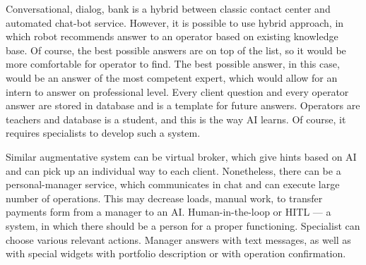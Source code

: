 Conversational, dialog, bank is a hybrid between classic contact center and automated chat-bot service.
However, it is possible to use hybrid approach, in which robot recommends answer to an operator based on existing knowledge base.
Of course, the best possible answers are on top of the list, so it would be more comfortable for operator to find.
The best possible answer, in this case, would be an answer of the most competent expert, which would allow for an intern to answer on professional level.
Every client question and every operator answer are stored in database and is a template for future answers.
Operators are teachers and database is a student, and this is the way AI learns.
Of course, it requires specialists to develop such a system.

Similar augmentative system can be virtual broker, which give hints based on AI and can pick up an individual way to each client.
Nonetheless, there can be a personal-manager service, which communicates in chat and can execute large number of operations.
This may decrease loads, manual work, to transfer payments form from a manager to an AI.
Human-in-the-loop or HITL — a system, in which there should be a person for a proper functioning.
Specialist can choose various relevant actions.
Manager answers with text messages, as well as with special widgets with portfolio description or with operation confirmation. 

